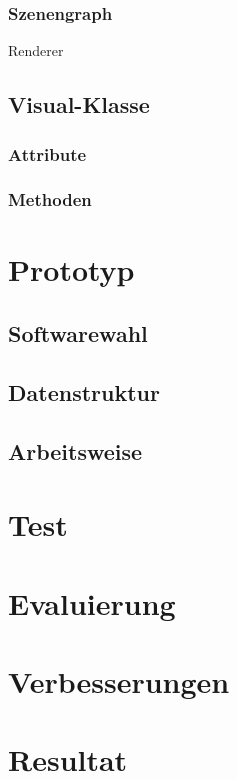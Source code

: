 

\subsubsection{Szenengraph}

Renderer

\subsection{Visual-Klasse}

\subsubsection{Attribute}

\subsubsection{Methoden}



\section{Prototyp}

\subsection{Softwarewahl}

\subsection{Datenstruktur}

\subsection{Arbeitsweise}



\section{Test}

\section{Evaluierung}

\section{Verbesserungen}

\section{Resultat}
